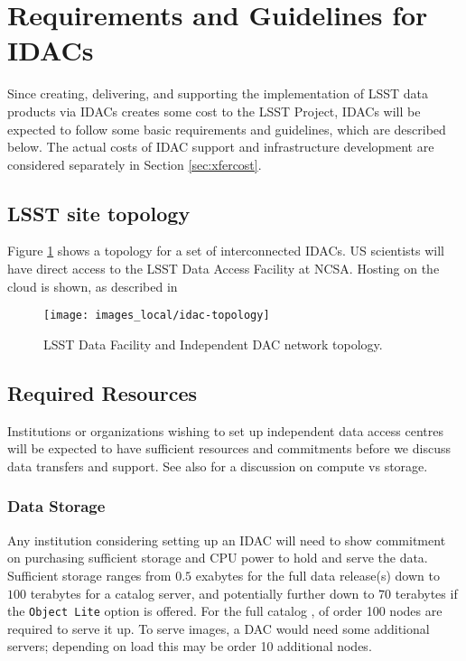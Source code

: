 \section{Requirements and Guidelines for IDACs}\label{sec:reqs}
Since creating, delivering, and supporting the implementation of LSST data products via IDACs creates some cost to the LSST Project, IDACs will be expected to follow some basic requirements and guidelines, which are described below.
The actual costs of IDAC support and infrastructure development are considered separately in Section \ref{sec:xfercost}.

\subsection{LSST site topology} \label{sec:topology}

Figure \ref{fig:idac-topology} shows a  topology for a set of interconnected IDACs.  US scientists will have direct access to the LSST Data Access Facility at NCSA.  Hosting on the cloud is shown, as described in

\begin{figure}
\begin{center}
\texttt{[image: images\_local/idac-topology]}
\caption{LSST Data Facility and Independent DAC network topology.  \label{fig:idac-topology}}
\end{center}
\end{figure}

\subsection{Required Resources} \label{sec:resources}
Institutions or organizations wishing to set up independent data access centres will be expected to have
sufficient resources and commitments before we discuss data transfers and support.
See also  for a discussion on compute vs storage.

\subsubsection{Data Storage}
Any institution considering setting up an IDAC will need to show commitment on purchasing sufficient storage and CPU power to hold and serve the data. Sufficient storage ranges from $0.5$ exabytes for the full data release(s) down to $100$ terabytes for a catalog server, and potentially further down to $70$ terabytes if the {\tt Object Lite} option is offered. For the full catalog , of order 100 nodes are required to serve it up. To serve images, a DAC would need some additional servers; depending on load this may be order 10 additional nodes.

